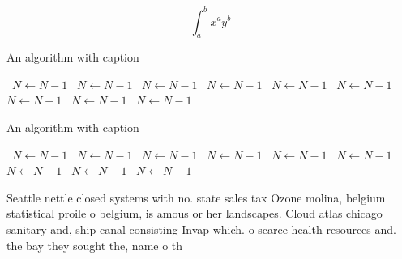 \documentclass[a4paper]{article}
\begin{document}
\[ \int_{a}^{b}{x^{a}y^{b}} \]

\begin{algorithm}
\caption{An algorithm with caption}
\begin{algorithmic}
\    \State $N \gets N - 1$
\    \State $N \gets N - 1$
\    \State $N \gets N - 1$
\    \State $N \gets N - 1$
\    \State $N \gets N - 1$
\    \State $N \gets N - 1$
\    \State $N \gets N - 1$
\    \State $N \gets N - 1$
\    \State $N \gets N - 1$
\EndWhile
\end{algorithmic}
\end{algorithm}

\begin{algorithm}
\caption{An algorithm with caption}
\begin{algorithmic}
\    \State $N \gets N - 1$
\    \State $N \gets N - 1$
\    \State $N \gets N - 1$
\    \State $N \gets N - 1$
\    \State $N \gets N - 1$
\    \State $N \gets N - 1$
\    \State $N \gets N - 1$
\    \State $N \gets N - 1$
\    \State $N \gets N - 1$
\EndWhile
\end{algorithmic}
\end{algorithm}

Seattle nettle closed systems with no. state sales tax Ozone molina, belgium statistical proile o belgium, is amous or her landscapes. Cloud atlas chicago sanitary and, ship canal consisting Invap which. o scarce health resources and. the bay they sought the, name o th
\end{document}
